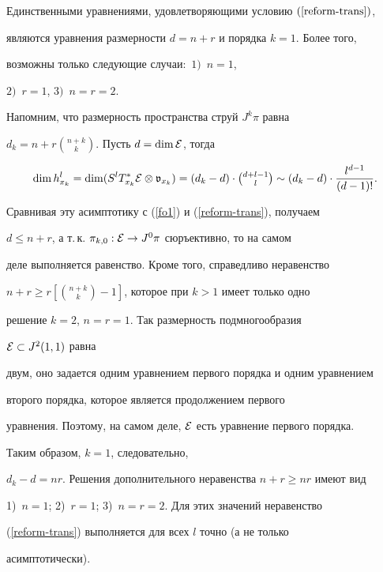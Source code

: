 \begin{prop}


Единственными уравнениями, удовлетворяющими условию $(\ref{reform-trans})$,


являются уравнения размерности $d=n+r$ и порядка $k=1$. Более того,


возможны только следующие случаи\/${:}$ $1)$~$n=1$,


$2)$~$r=1$, $3)$~$n=r=2$.


\end{prop}





\begin{pf}


Напомним, что размерность пространства струй $J^k\pi$ равна


$d_k=n+r\binom{n+k}k$. Пусть $d=\dim{\cal E}$, тогда


$$


\dim h^l_{x_k}=\dim(S^lT^*_{x_k}\E\ot\vg_{x_k})=(d_k-d)\cdot


\tbinom{d+l-1}l\sim(d_k-d)\cdot\dfrac{l^{d-1}}{(d-1)!}.


$$


Сравнивая эту асимптотику с (\ref{fo1}) и (\ref{reform-trans}), получаем


$d\le n+r$, а т.\,к. $\pi_{k,0}:{\cal E}\to J^0\pi$ сюръективно, то на самом


деле выполняется равенство. Кроме того, справедливо неравенство


$n+r\ge r[\binom{n+k}k-1]$, которое при $k>1$ имеет только одно


решение $k=2$, $n=r=1$. Так размерность подмногообразия


${\cal E}\subset J^2(1,1)$ равна


двум, оно задается одним уравнением первого порядка и одним уравнением


второго порядка, которое является продолжением первого


уравнения. Поэтому, на самом деле, ${\cal E}$ есть уравнение первого порядка.





Таким образом, $k=1$, следовательно,


$d_k-d=nr$. Решения дополнительного неравенства $n+r\ge nr$ имеют вид


1)~$n=1$; 2)~$r=1$; 3)~$n=r=2$. Для этих значений неравенство


(\ref{reform-trans}) выполняется для всех $l$ точно (а не только


асимптотически).


\end{pf}








